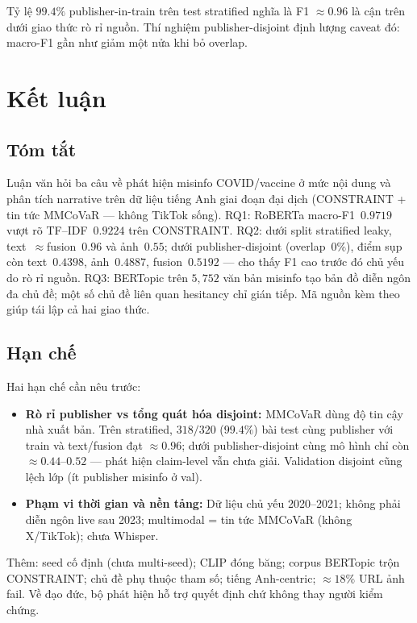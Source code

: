 \documentclass[12pt, a4paper]{report}
\begin{document}
Tỷ lệ $99.4\%$ publisher-in-train trên test stratified nghĩa là F1 $\approx 0.96$ là cận trên dưới giao thức rò rỉ nguồn.
Thí nghiệm publisher-disjoint định lượng caveat đó: macro-F1 gần như giảm một nửa khi bỏ overlap.

\chapter{Kết luận}
\label{chap:conclusion}

\section{Tóm tắt}
\label{sec:summary}

Luận văn hỏi ba câu về phát hiện misinfo COVID/vaccine ở mức nội dung và phân tích narrative trên dữ liệu tiếng Anh giai đoạn đại dịch (CONSTRAINT + tin tức MMCoVaR --- không TikTok sống).
RQ1: RoBERTa macro-F1~$0.9719$ vượt rõ TF--IDF~$0.9224$ trên CONSTRAINT.
RQ2: dưới split stratified leaky, text~$\approx$fusion~$0.96$ và ảnh~$0.55$; dưới publisher-disjoint (overlap~$0\%$), điểm sụp còn text~$0.4398$, ảnh~$0.4887$, fusion~$0.5192$ --- cho thấy F1 cao trước đó chủ yếu do rò rỉ nguồn.
RQ3: BERTopic trên $5{,}752$ văn bản misinfo tạo bản đồ diễn ngôn đa chủ đề; một số chủ đề liên quan hesitancy chỉ gián tiếp.
Mã nguồn kèm theo giúp tái lập cả hai giao thức.

\section{Hạn chế}
\label{sec:limitations}

Hai hạn chế cần nêu trước:
\begin{itemize}
  \item \textbf{Rò rỉ publisher vs tổng quát hóa disjoint:}
        MMCoVaR dùng độ tin cậy nhà xuất bản.
        Trên stratified, $318/320$ ($99.4\%$) bài test cùng publisher với train và text/fusion đạt $\approx 0.96$; dưới publisher-disjoint cùng mô hình chỉ còn $\approx 0.44$--$0.52$ --- phát hiện claim-level vẫn chưa giải.
        Validation disjoint cũng lệch lớp (ít publisher misinfo ở val).
  \item \textbf{Phạm vi thời gian và nền tảng:}
        Dữ liệu chủ yếu 2020--2021; không phải diễn ngôn live sau 2023; multimodal = tin tức MMCoVaR (không X/TikTok); chưa Whisper.
\end{itemize}
Thêm: seed cố định (chưa multi-seed); CLIP đóng băng; corpus BERTopic trộn CONSTRAINT; chủ đề phụ thuộc tham số; tiếng Anh-centric; $\approx 18\%$ URL ảnh fail.
Về đạo đức, bộ phát hiện hỗ trợ quyết định chứ không thay người kiểm chứng.
\end{document}
